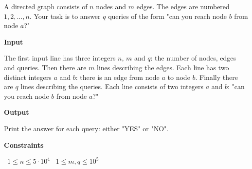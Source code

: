 A directed graph consists of $n$ nodes and $m$ edges. The edges are numbered $1,2,\dots,n$.
Your task is to answer $q$ queries of the form "can you reach node $b$ from node $a$?"

\vspace{0.3cm}\noindent\textbf{Input}

The first input line has three integers $n$, $m$ and $q$: the number of nodes, edges and queries.
Then there are $m$ lines describing the edges. Each line has two distinct integers $a$ and $b$: there is an edge from node $a$ to node $b$.
Finally there are $q$ lines describing the queries. Each line consists of two integers $a$ and $b$: "can you reach node $b$ from node $a$?"

\vspace{0.3cm}\noindent\textbf{Output}

Print the answer for each query: either "YES" or "NO".

\vspace{0.3cm}\noindent\textbf{Constraints}

\textbullet\ $1 \le n \le 5 \cdot 10^4$
\textbullet\ $1 \le m,q \le 10^5$